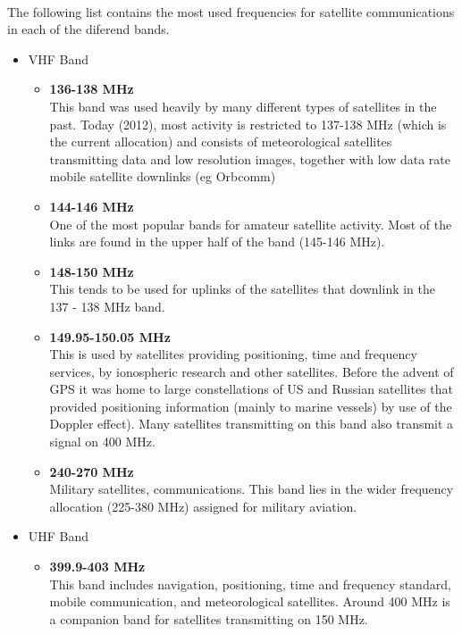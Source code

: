 \documentclass[12pt,a4paper]{report}
\begin{document}
\paragraph{}The following list contains the most used frequencies for satellite communications in each of the diferend bands.

\begin{itemize}
\item VHF Band
	\begin{itemize}
	\item \textbf{136-138 MHz}\\
	This band was used heavily by many different types of satellites in the past. Today (2012), most activity is restricted to 137-138 MHz (which is the current allocation) and consists of meteorological satellites transmitting data and low resolution images, together with low data rate mobile satellite downlinks (eg Orbcomm)
	\item \textbf{144-146 MHz}\\
	One of the most popular bands for amateur satellite activity. Most of the links are found in the upper half of the band (145-146 MHz).
	\item \textbf{148-150 MHz}\\
	This tends to be used for uplinks of the satellites that downlink in the 137 - 138 MHz band.
	\item \textbf{149.95-150.05 MHz}\\
	This is used by satellites providing positioning, time and frequency services, by ionospheric research and other satellites. Before the advent of GPS it was home to large constellations of US and Russian satellites that provided positioning information (mainly to marine vessels) by use of the Doppler effect). Many satellites transmitting on this band also transmit a signal on 400 MHz.
	\item \textbf{240-270 MHz}\\
	Military satellites, communications. This band lies in the wider frequency allocation (225-380 MHz) assigned for military aviation.
	\end{itemize}
\item UHF Band
	\begin{itemize}
	\item \textbf{399.9-403 MHz}\\
	This band includes navigation, positioning, time and frequency standard, mobile communication, and meteorological satellites. Around 400 MHz is a companion band for satellites transmitting on 150 MHz.

\end{itemize}
\end{itemize}
\end{document}
